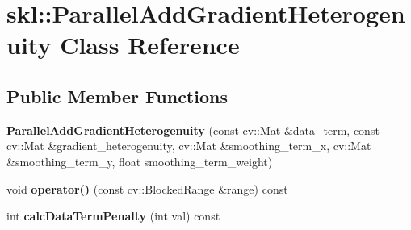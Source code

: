 \hypertarget{classskl_1_1_parallel_add_gradient_heterogenuity}{}\section{skl\+:\+:Parallel\+Add\+Gradient\+Heterogenuity Class Reference}
\label{classskl_1_1_parallel_add_gradient_heterogenuity}
\subsection*{Public Member Functions}
\begin{DoxyCompactItemize}
\item 
\hypertarget{classskl_1_1_parallel_add_gradient_heterogenuity_a85b164b06a685548f6f6b7e106aa1fa7}{}\label{classskl_1_1_parallel_add_gradient_heterogenuity_a85b164b06a685548f6f6b7e106aa1fa7} 
{\bfseries Parallel\+Add\+Gradient\+Heterogenuity} (const cv\+::\+Mat \&data\+\_\+term, const cv\+::\+Mat \&gradient\+\_\+heterogenuity, cv\+::\+Mat \&smoothing\+\_\+term\+\_\+x, cv\+::\+Mat \&smoothing\+\_\+term\+\_\+y, float smoothing\+\_\+term\+\_\+weight)
\item 
\hypertarget{classskl_1_1_parallel_add_gradient_heterogenuity_a85da87e245322013360fea2232e161b9}{}\label{classskl_1_1_parallel_add_gradient_heterogenuity_a85da87e245322013360fea2232e161b9} 
void {\bfseries operator()} (const cv\+::\+Blocked\+Range \&range) const
\item 
\hypertarget{classskl_1_1_parallel_add_gradient_heterogenuity_aabafc3b922fcd0809692c2b187bb9134}{}\label{classskl_1_1_parallel_add_gradient_heterogenuity_aabafc3b922fcd0809692c2b187bb9134} 
int {\bfseries calc\+Data\+Term\+Penalty} (int val) const
\end{DoxyCompactItemize}
